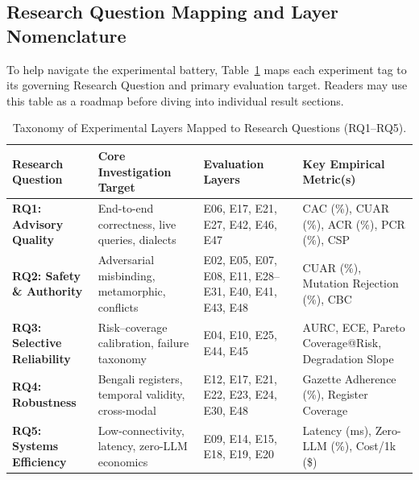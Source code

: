 \subsection{Research Question Mapping and Layer Nomenclature}
To help navigate the experimental battery, Table~\ref{tab:rq_mapping} maps each experiment tag to its governing Research Question and primary evaluation target. Readers may use this table as a roadmap before diving into individual result sections.

\begin{table}[pos=t]
\centering
\small
\caption{Taxonomy of Experimental Layers Mapped to Research Questions (RQ1--RQ5).}
\label{tab:rq_mapping}
\begin{tabular}{p{3.8cm} p{5.0cm} p{3.4cm} p{4.2cm}}
\toprule
\textbf{Research Question} & \textbf{Core Investigation Target} & \textbf{Evaluation Layers} & \textbf{Key Empirical Metric(s)} \\
\midrule
\textbf{RQ1: Advisory Quality} & End-to-end correctness, live queries, dialects & E06, E17, E21, E27, E42, E46, E47 & CAC (\%), CUAR (\%), ACR (\%), PCR (\%), CSP \\
\textbf{RQ2: Safety \& Authority} & Adversarial misbinding, metamorphic, conflicts & E02, E05, E07, E08, E11, E28--E31, E40, E41, E43, E48 & CUAR (\%), Mutation Rejection (\%), CBC \\
\textbf{RQ3: Selective Reliability} & Risk--coverage calibration, failure taxonomy & E04, E10, E25, E44, E45 & AURC, ECE, Pareto Coverage@Risk, Degradation Slope \\
\textbf{RQ4: Robustness} & Bengali registers, temporal validity, cross-modal & E12, E17, E21, E22, E23, E24, E30, E48 & Gazette Adherence (\%), Register Coverage \\
\textbf{RQ5: Systems Efficiency} & Low-connectivity, latency, zero-LLM economics & E09, E14, E15, E18, E19, E20 & Latency (ms), Zero-LLM (\%), Cost/1k (\$) \\
\bottomrule
\end{tabular}
\end{table}

